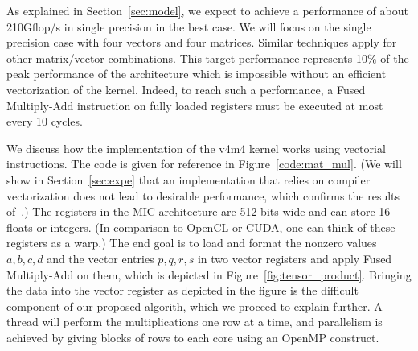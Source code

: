 \documentclass[10pt,conference,compsocconf]{IEEEtran}
\begin{document}
As explained in Section~\ref{sec:model}, we expect to achieve a performance of
about 210Gflop/s in single precision in the best case. We will focus
on the single precision case with four vectors and four matrices. 
Similar techniques apply for other matrix/vector combinations. This target
performance represents 10\% of the peak performance of the
architecture which is impossible without an efficient vectorization of
the kernel. Indeed, to reach such a performance, a Fused Multiply-Add
instruction on fully loaded registers must be executed at most every
10 cycles.

We discuss how the implementation of the v4m4 kernel works using
vectorial instructions. The code is given for reference in
Figure~\ref{code:mat_mul}. (We will show in Section~\ref{sec:expe}
that an implementation that relies on compiler vectorization does not lead
to desirable performance, which confirms the results
of~\cite{Saule13-ARXIV}.) The registers in the MIC architecture are
512 bits wide and can store 16 floats or integers. (In comparison to
OpenCL or CUDA, one can think of these registers as a warp.) The end
goal is to load and format the nonzero values $a,b,c,d$
and the vector entries $p,q,r,s$ in two vector registers and 
apply Fused Multiply-Add on them, which is depicted in
Figure~\ref{fig:tensor_product}. Bringing the data into the vector
register as depicted in the figure is the difficult component of our 
proposed algorith, which we proceed to explain further. 
A thread will perform the multiplications one row at a time,
and parallelism is achieved by giving blocks of rows to each core
using an OpenMP construct.
\end{document}
